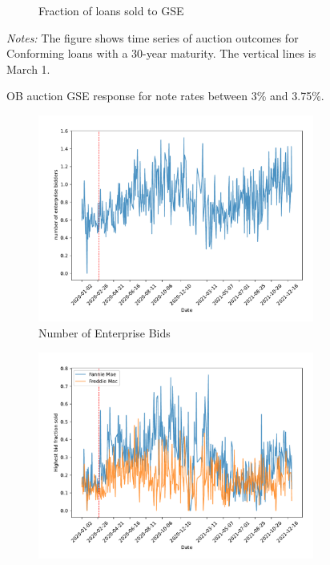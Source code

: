 \documentclass[11pt,a4paper]{article}
\begin{document}
\begin{figure}[h]
\begin{subfigure}[b]{0.49\textwidth}
      \caption{ Fraction of loans sold to GSE}
     \end{subfigure}
     \caption{OB auction  GSE response for note rates between 3\% and 3.75\%. } 
   \begin{minipage}{\textwidth}
      \footnotesize{\textit{Notes:} The figure shows time series of auction outcomes for Conforming loans with a 30-year maturity. The vertical lines is March 1.  } 
      \end{minipage}
\end{figure}

\begin{figure}[h]
  \centering
  \begin{subfigure}[b]{0.49\textwidth}
      \includegraphics[width=0.998\textwidth]{../results/figures/Number of Enterprise Bidders_mean_mat30_loan1_timeseries_nr_4_4.75.pdf}
      \caption{Number of Enterprise Bids}
     \end{subfigure}
     \begin{subfigure}[b]{0.49\textwidth}
      \includegraphics[width=0.998\textwidth]{../results/figures/sold_FreddieBid_mean_mat30_loan1_timeseries_nr_4_4.75.pdf}

\end{subfigure}
\end{figure}
\end{document}
